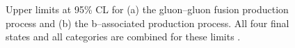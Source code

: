 \begin{figure}[h!]
\begin{center}
\end{center}
\caption{Upper limits at 95\% CL for (a) the gluon--gluon fusion production
process and (b) the b--associated production process. All four final states and 
all categories are combined for these limits \cite{CMS-PAS-HIG-16-006}.}
\label{fig:mssm_results_hig16006_limits}
\end{figure}

